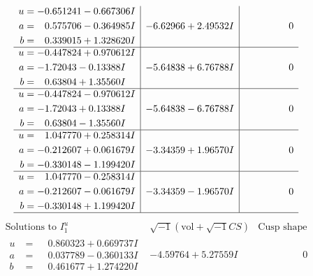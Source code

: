 \documentclass[1p]{elsarticle_modified}
\theoremstyle{definition}
\newcommand{\I}{\sqrt{-1}}
\begin{document}
$$\begin{array}{c|c|c}
\begin{aligned}
u &= -0.651241 - 0.667306 I \\
a &= \phantom{-}0.575706 - 0.364985 I \\
b &= \phantom{-}0.339015 + 1.328620 I\end{aligned}
 & -6.62966 + 2.49532 I & \phantom{-0.000000 } 0 \\ \hline\begin{aligned}
u &= -0.447824 + 0.970612 I \\
a &= -1.72043 - 0.13388 I \\
b &= \phantom{-}0.63804 + 1.35560 I\end{aligned}
 & -5.64838 + 6.76788 I & \phantom{-0.000000 } 0 \\ \hline\begin{aligned}
u &= -0.447824 - 0.970612 I \\
a &= -1.72043 + 0.13388 I \\
b &= \phantom{-}0.63804 - 1.35560 I\end{aligned}
 & -5.64838 - 6.76788 I & \phantom{-0.000000 } 0 \\ \hline\begin{aligned}
u &= \phantom{-}1.047770 + 0.258314 I \\
a &= -0.212607 + 0.061679 I \\
b &= -0.330148 - 1.199420 I\end{aligned}
 & -3.34359 + 1.96570 I & \phantom{-0.000000 } 0 \\ \hline\begin{aligned}
u &= \phantom{-}1.047770 - 0.258314 I \\
a &= -0.212607 - 0.061679 I \\
b &= -0.330148 + 1.199420 I\end{aligned}
 & -3.34359 - 1.96570 I & \phantom{-0.000000 } 0\\
 \hline 
 \end{array}$$\newpage$$\begin{array}{c|c|c}  
\text{Solutions to }I^u_{1}& \I (\text{vol} + \sqrt{-1}CS) & \text{Cusp shape}\\
 \hline 
\begin{aligned}
u &= \phantom{-}0.860323 + 0.669737 I \\
a &= \phantom{-}0.037789 - 0.360133 I \\
b &= \phantom{-}0.461677 + 1.274220 I\end{aligned}
 & -4.59764 + 5.27559 I & \phantom{-0.000000 } 0 \\ \hline\begin{aligned}

\end{aligned}
\end{array}$$
\end{document}
